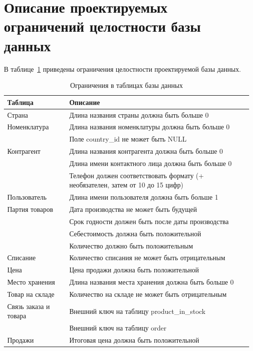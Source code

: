 \section{Описание проектируемых ограничений целостности базы данных}
В таблице~\ref{tab:constraints} приведены ограничения целостности проектируемой базы данных.
\begin{table}[h]
	\centering
	\caption{Ограничения в таблицах базы данных}
	\label{tab:constraints}
	\begin{tabular}{|l|p{11cm}|}
		\hline
		\textbf{Таблица} & \textbf{Описание} \\
		\hline
		Страна & Длина названия страны должна быть больше 0 \\
		\hline
		Номенклатура & Длина названия номенклатуры должна быть больше 0 \\
		\cline{2-2}
		& Поле country\_id не может быть NULL \\
		\hline
		Контрагент & Длина названия контрагента должна быть больше 0 \\
		\cline{2-2}
		& Длина имени контактного лица должна быть больше 0 \\
		\cline{2-2}
		& Телефон должен соответствовать формату (+ необязателен, затем от 10 до 15 цифр) \\
		\hline
		Пользователь & Длина имени пользователя должна быть больше 1 \\
		\hline
		Партия товаров & Дата производства не может быть будущей \\
		\cline{2-2}
		& Срок годности должен быть после даты производства \\
		\cline{2-2}
		& Себестоимость должна быть положительной \\
		\cline{2-2}
		& Количество должно быть положительным \\
		\hline
		Списание & Количество списания не может быть отрицательным \\
		\hline
		Цена & Цена продажи должна быть положительной \\
		\hline
		Место хранения & Длина названия места хранения должна быть больше 0 \\
		\hline
		Товар на складе & Количество на складе не может быть отрицательным \\
		\hline
		Связь заказа и товара & Внешний ключ на таблицу product\_in\_stock \\
		\cline{2-2}
		& Внешний ключ на таблицу order \\
		\hline
		Продажи & Итоговая цена должна быть положительной \\
		\hline
	\end{tabular}
\end{table}

